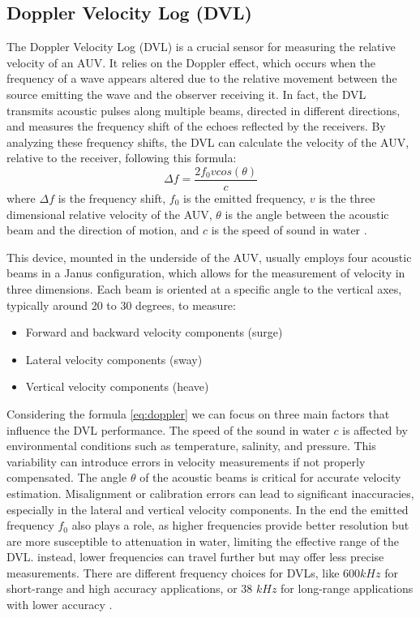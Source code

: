 \subsection{Doppler Velocity Log (DVL)}
The Doppler Velocity Log (DVL) is a crucial sensor for measuring the relative velocity of an AUV. 
It relies on the Doppler effect, which occurs when the frequency of a wave appears altered due to the relative movement between the source emitting the wave and the 
observer receiving it. In fact, the DVL transmits acoustic pulses along multiple beams, directed in different directions, and measures the frequency shift of the 
echoes reflected by the receivers. By analyzing these frequency shifts, the DVL can calculate the velocity of the AUV, relative to the receiver, following this formula:
\begin{equation}
    \Delta f = \frac{2 f_0 v cos(\theta)}{c}
    \label{eq:doppler}
\end{equation}
where $\Delta f$ is the frequency shift, $f_0$ is the emitted frequency, $v$ is the three dimensional relative velocity of the AUV, $\theta$ is the angle between the acoustic beam and 
the direction of motion, and $c$ is the speed of sound in water \cite{annapurnaEnhancingAccuracyDoppler2024}.

This device, mounted in the underside of the AUV, usually employs four acoustic beams in a Janus configuration, which allows for the measurement of velocity in three dimensions. Each beam is 
oriented at a specific angle to the vertical axes, typically around 20 to 30 degrees, to measure:
\begin{itemize}
    \item Forward and backward velocity components (surge)
    \item Lateral velocity components (sway)
    \item Vertical velocity components (heave)
\end{itemize}
Considering the formula \ref{eq:doppler} we can focus on three main factors that influence the DVL performance. The speed of the sound in water $c$ 
is affected by environmental conditions such as temperature, salinity, and pressure. This variability can introduce errors in velocity measurements if not properly compensated.
The angle $\theta$ of the acoustic beams is critical for accurate velocity estimation. Misalignment or calibration errors can lead to significant inaccuracies, especially in the 
lateral and vertical velocity components.
In the end the emitted frequency $f_0$ also plays a role, as higher frequencies provide better resolution but are more susceptible to attenuation in water, limiting the effective range of the DVL.
instead, lower frequencies can travel further but may offer less precise measurements. There are different frequency choices for DVLs, like 600$kHz$ for short-range and high accuracy applications, or
38 $kHz$ for long-range applications with lower accuracy \cite{sarangapaniMultifrequencyPhasedArray2022}.

